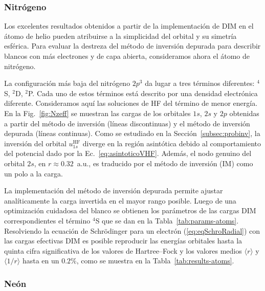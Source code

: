 \subsubsection*{Nitrógeno}

Los excelentes resultados obtenidos a partir de la implementación de DIM 
en el átomo de helio pueden atribuirse a la simplicidad del orbital y su 
simetría esférica. Para evaluar la destreza del método de inversión 
depurada para describir blancos con más electrones y de capa abierta, 
consideramos ahora el átomo de nitrógeno. 

La configuración más baja del nitrógeno $2p^3$ da lugar a tres términos 
diferentes: $^4$S, $^2$D, $^2$P. Cada uno de estos términos está 
descrito por una densidad electrónica diferente. Consideramos aquí 
las soluciones de HF del término de menor energía. En la  Fig.~\ref{fig:Nzeff} se muestran las cargas de los orbitales $1s$, $2s$ y $2p$ obtenidas a partir del método de inversión (líneas discontinuas) y el método de inversión depurada (líneas continuas). Como se estudiado en la Sección~\ref{subsec:probinv}, la inversión del orbital $u_{1s}^{\mathrm{HF}}$ diverge en la región asintótica debido al comportamiento del potencial dado por la Ec.~\ref{eq:asintoticoVHF}. Además, el nodo genuino del orbital $2s$, en $r\approx 0.32$~a.u., es traducido por el método de inversión (IM) como un polo a la carga. 

La implementación del método de inversión depurada permite ajustar analíticamente la carga invertida en el mayor rango posible. Luego de una optimización cuidadosa del blanco se obtienen los parámetros de las cargas DIM correspondientes el término $^4$S que se dan en la Tabla~\ref{tab:params-atoms}. Resolviendo la ecuación de Schr\"odinger para un electrón (\ref{eq:eqSchroRadial}) con las cargas efectivas DIM es posible reproducir las energías orbitales hasta la quinta cifra significativa de los valores de Hartree--Fock y los valores medios $\langle r \rangle$ y $\langle 1/r \rangle$ hasta en un $0.2\%$, como se muestra en la Tabla~\ref{tab:results-atoms}.  


\subsubsection*{Neón}

